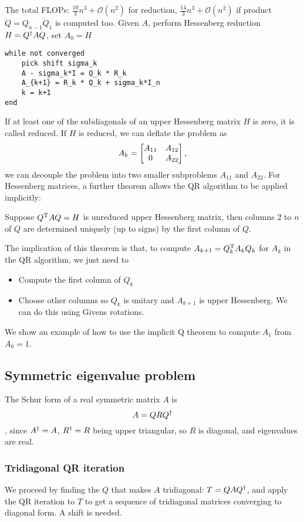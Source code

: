 \documentclass{article}
\begin{document}
The total FLOPs: $\frac{10}{3}n^3+\mathcal{O}(n^2)$ for reduction, $\frac{14}{3}n^3+\mathcal{O}(n^2)$ if product $Q=Q_{n-1}\dot Q_1$ is computed too. Given $A$, perform Hessenberg reduction $H=Q^{\dagger} AQ$, set $A_0=H$
\begin{verbatim}
while not converged
    pick shift sigma_k
    A - sigma_k*I = Q_k * R_k
    A_{k+1} = R_k * Q_k + sigma_k*I_n
    k = k+1
end
\end{verbatim}
If at least one of the subdiagonals of an upper Hessenberg matrix $H$ is zero, it is called reduced. If $H$ is reduced, we can deflate the problem as 
\begin{equation}
    A_k = \begin{bmatrix}{A_{11}}&{A_{12}}\\{0}&{A_{22}}\end{bmatrix},
\end{equation}
we can decouple the problem into two smaller subproblems $A_{11}$ and $A_{22}$. For Hessenberg matrices, a further theorem allows the QR algorithm to be applied implicitly:
\begin{theorem}
    Suppose $Q^{\text{T}} AQ=H$ is unreduced upper Hessenberg matrix, then columns $2$ to $n$ of $Q$ are determined uniquely (up to signs) by the first column of $Q$.
\end{theorem}
The implication of this theorem is that, to compute $A_{k+1}=Q_k^{\text{T}} A_k Q_k$ for $A_k$ in the QR algorithm, we just need to
\begin{itemize}
    \item Compute the first column of $Q_k$
    \item Choose other columns so $Q_k$ is unitary and $A_{k+1}$ is upper Hessenberg. We can do this using Givens rotations.
\end{itemize}

We show an example of how to use the implicit Q theorem to compute $A_1$ from $A_0=1$.

\subsection{Symmetric eigenvalue problem}
The Schur form of a real symmetric matrix $A$ is
\begin{equation}
    A=QRQ^{\dagger}
\end{equation},
since $A^{\dagger}=A$, $R^{\dagger}=R$ being upper triangular, so $R$ is diagonal, and eigenvalues are real.

\subsubsection{Tridiagonal QR iteration}
We proceed by finding the $Q$ that makes $A$ tridiagonal:
$T=QAQ^{\dagger}$, and apply the QR iteration to $T$ to get a sequence of tridiagonal matrices converging to diagonal form. A shift is needed.
\end{document}
